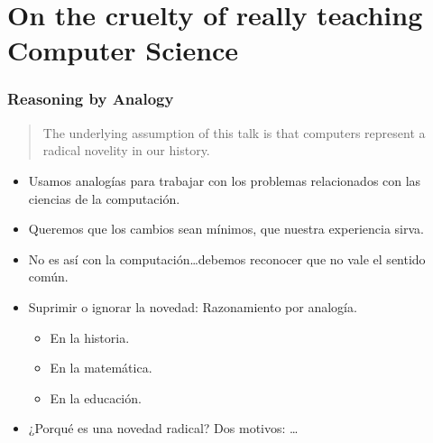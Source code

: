 \documentclass[ignorenonframetext,]{beamer}
\begin{document}
\section{On the cruelty of really teaching Computer Science}

\begin{frame}\frametitle{Reasoning by Analogy}

\begin{quote}
The underlying assumption of this talk is that computers represent a
radical novelity in our history.
\end{quote}

\begin{itemize}[<+->]
\itemsep1pt\parskip0pt
\item
  Usamos analogías para trabajar con los problemas relacionados con las
  ciencias de la computación.
\item
  Queremos que los cambios sean mínimos, que nuestra experiencia sirva.
\item
  No es así con la computación\ldots{}debemos reconocer que no vale el
  sentido común.
\item
  Suprimir o ignorar la novedad: Razonamiento por analogía.

  \begin{itemize}[<+->]
  \itemsep1pt\parskip0pt
  \item
    En la historia.
  \item
    En la matemática.
  \item
    En la educación.
  \end{itemize}
\item
  ¿Porqué es una novedad radical? Dos motivos: \ldots{}
\end{itemize}

\end{frame}
\end{document}
